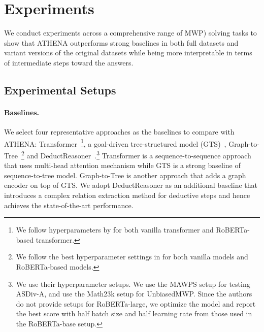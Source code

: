 \documentclass[11pt]{article}
\newcommand{\1}{\mathbb{1}}
\begin{document}
\section{Experiments}

We conduct experiments across a comprehensive range of MWP) solving tasks to show that ATHENA outperforms strong baselines in both full datasets and variant versions of the original datasets while being more interpretable in terms of intermediate steps toward the answers.






\subsection{Experimental Setups}



\paragraph{Baselines.}
We select four representative approaches as the baselines to compare with ATHENA: 
Transformer~\citep{vaswani-etal-2017-attention}\footnote{We follow hyperparameters by \citet{lan-etal-2022-mwptoolkit} for both vanilla transformer and RoBERTa-based transformer.},
a goal-driven tree-structured model (GTS)~\citep{xie-sun-2019-goal},
Graph-to-Tree~\citep{zhang-etal-2020-graph-tree}\footnote{We follow the best hyperparameter settings in \citet{patel-etal-2021-nlp} for both vanilla models and RoBERTa-based models.}
and Deduct\-Reasoner~\citep{jie-etal-2022-learning}.\footnote{We use their hyperparameter setups. We use the MAWPS setup for testing ASDiv-A, and use the Math23k setup for UnbiasedMWP. Since the authors do not provide setups for RoBERTa-large, we optimize the model and report the best score with half batch size and half learning rate from those used in the RoBERTa-base setup.}
Transformer is a sequence-to-sequence approach that uses multi-head attention mechanism while
GTS is a strong baseline of sequence-to-tree model.
Graph-to-Tree is another approach that adds a graph encoder on top of GTS.
We adopt DeductReasoner as an additional baseline that introduces a complex relation extraction method for deductive steps and hence achieves the state-of-the-art performance.
\end{document}
